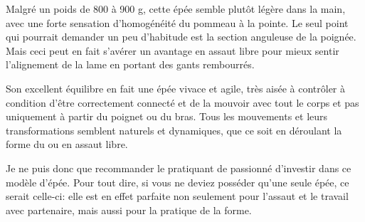 Malgré un poids de 800 à 900 g, cette épée semble plutôt légère dans la main, avec une forte sensation d'homogénéité du pommeau à la pointe. Le seul point qui pourrait demander un peu d'habitude est la section anguleuse de la poignée. Mais ceci peut en fait s'avérer un avantage en assaut libre pour mieux sentir l'alignement de la lame en portant des gants rembourrés.

Son excellent équilibre en fait une épée vivace et agile, très aisée à contrôler à condition d'être correctement connecté et de la mouvoir avec tout le corps et pas uniquement à partir du poignet ou du bras. Tous les mouvements et leurs transformations semblent naturels et dynamiques, que ce soit en déroulant la forme \Kunlun{} du \Yangjia{} \Michuan{} ou en assaut libre.

Je ne puis donc que recommander le pratiquant de \Taijijian{} passionné d'investir dans ce modèle d'épée. Pour tout dire, si vous ne deviez posséder qu'une seule épée, ce serait celle-ci: elle est en effet parfaite non seulement pour l'assaut et le travail avec partenaire, mais aussi pour la pratique de la forme.
